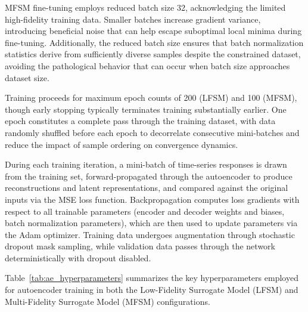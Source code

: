 \documentclass[12pt,a4paper]{report}
\begin{document}
MFSM fine-tuning employs reduced batch size 32, acknowledging the limited high-fidelity training data. Smaller batches increase gradient variance, introducing beneficial noise that can help escape suboptimal local minima during fine-tuning. Additionally, the reduced batch size ensures that batch normalization statistics derive from sufficiently diverse samples despite the constrained dataset, avoiding the pathological behavior that can occur when batch size approaches dataset size.

Training proceeds for maximum epoch counts of 200 (LFSM) and 100 (MFSM), though early stopping typically terminates training substantially earlier. One epoch constitutes a complete pass through the training dataset, with data randomly shuffled before each epoch to decorrelate consecutive mini-batches and reduce the impact of sample ordering on convergence dynamics.

During each training iteration, a mini-batch of time-series responses is drawn from the training set, forward-propagated through the autoencoder to produce reconstructions and latent representations, and compared against the original inputs via the MSE loss function. Backpropagation computes loss gradients with respect to all trainable parameters (encoder and decoder weights and biases, batch normalization parameters), which are then used to update parameters via the Adam optimizer. Training data undergoes augmentation through stochastic dropout mask sampling, while validation data passes through the network deterministically with dropout disabled.

Table~\ref{tab:ae_hyperparameters} summarizes the key hyperparameters employed for autoencoder training in both the Low-Fidelity Surrogate Model (LFSM) and Multi-Fidelity Surrogate Model (MFSM) configurations.
\end{document}
